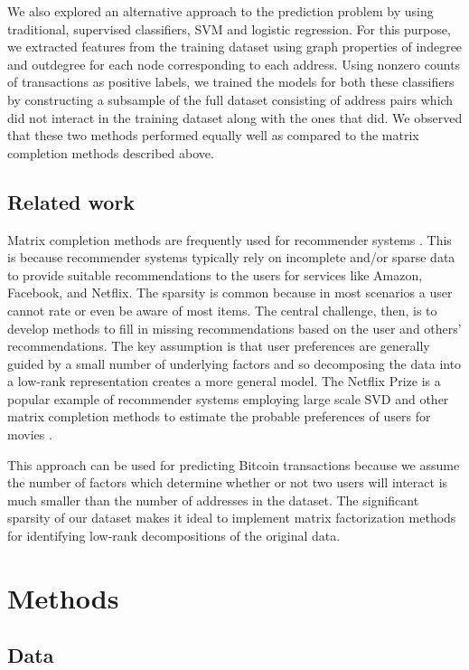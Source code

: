 \documentclass{article} %
\begin{document}
We also explored an alternative approach to the prediction problem by using traditional, supervised classifiers, SVM and logistic regression. For this purpose, we extracted features from the training dataset using graph properties of indegree and outdegree for each node corresponding to each address. Using nonzero counts of transactions as positive labels, we trained the models for both these classifiers by constructing a subsample of the full dataset consisting of address pairs which did not interact in the training dataset along with the ones that did. We observed that these two methods performed equally well as compared to the matrix completion methods described above.

\subsection{Related work}

Matrix completion methods are frequently used for recommender systems \cite{koren2009matrix}. This is because recommender systems typically rely on incomplete and/or sparse data to provide suitable recommendations to the users for services like Amazon, Facebook, and Netflix. The sparsity is common because in most scenarios a user cannot rate or even be aware of most items. The central challenge, then, is to develop methods to fill in missing recommendations based on the user and others' recommendations. The key assumption is that user preferences are generally guided by a small number of underlying factors and so decomposing the data into a low-rank representation creates a more general model. The Netflix Prize is a popular example of recommender systems employing large scale SVD and other matrix completion methods to estimate the probable preferences of users for movies \cite{bennett2007netflix}.

This approach can be used for predicting Bitcoin transactions because we assume the number of factors which determine whether or not two users will interact is much smaller than the number of addresses in the dataset. The significant sparsity of our dataset makes it ideal to implement matrix factorization methods for identifying low-rank decompositions of the original data.

\section{Methods}

\subsection{Data}
\end{document}
